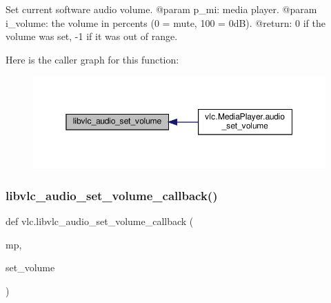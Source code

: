 \begin{DoxyVerb}Set current software audio volume.
@param p_mi: media player.
@param i_volume: the volume in percents (0 = mute, 100 = 0dB).
@return: 0 if the volume was set, -1 if it was out of range.
\end{DoxyVerb}
 Here is the caller graph for this function\+:
\nopagebreak
\begin{figure}[H]
\begin{center}
\leavevmode
\includegraphics[width=350pt]{namespacevlc_a29afce2ad9d6cc26546b735653fe67b7_icgraph}
\end{center}
\end{figure}
\mbox{\label{namespacevlc_a304ceaa4a56a980bf12623e54edd3444}} 
\subsubsection{\texorpdfstring{libvlc\+\_\+audio\+\_\+set\+\_\+volume\+\_\+callback()}{libvlc\_audio\_set\_volume\_callback()}}
{\footnotesize\ttfamily def vlc.\+libvlc\+\_\+audio\+\_\+set\+\_\+volume\+\_\+callback (\begin{DoxyParamCaption}\item[{}]{mp,  }\item[{}]{set\+\_\+volume }\end{DoxyParamCaption})}

